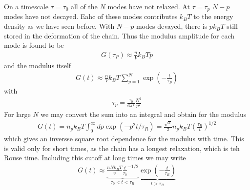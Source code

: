 \documentclass[letterpaper,10pt,english]{sphinxmanual}
\begin{document}
\sphinxAtStartPar
On a timescale \(\tau=\tau_0\) all of the \(N\) modes have not relaxed. At \(\tau=\tau_p\) \(N-p\) modes have not decayed. Eahc of these modes contributes \(k_B T\) to the energy density as we have seen before. With \(N-p\) modes devayed, there is \(pk_B T\) still stored in the deformation of the chain. Thus the modulus amplitude for each mode is found to be
\begin{equation*}
\begin{split}G(\tau_P)\approx \frac{n}{V}k_B T p\end{split}
\end{equation*}
\sphinxAtStartPar
and the modulus itself
\begin{equation*}
\begin{split}G(t)\approx \frac{n}{V}k_B T \sum_{p=1}^{N}\exp\left (-\frac{t}{\tau_P}\right )\end{split}
\end{equation*}
\sphinxAtStartPar
with
\begin{equation*}
\begin{split}\tau_p=\frac{\tau_0}{6\pi^2}\frac{N^2}{p^2}\end{split}
\end{equation*}
\sphinxAtStartPar
For large \(N\) we may convert the sum into an integral and obtain for the modulus
\begin{equation*}
\begin{split}G(t)=n_{p} k_{B} T \int_{0}^{\infty} d p \exp \left(-p^{2} t / \tau_{R}\right)=\frac{\sqrt{\pi}}{2} n_{p} k_{B} T\left(\frac{\tau_{R}}{t}\right)^{1 / 2}\end{split}
\end{equation*}
\sphinxAtStartPar
which gives an inversse square root dependence for the modulus with time. This is valid only for short times, as the chain has a longest relaxation, which is teh Rouse time. Including this cut\sphinxhyphen{}off at long times we may write
\begin{equation*}
\begin{split}G(t)\approx \underbrace{\frac{nNk_B T}{v}\frac{t}{\tau_0}^{-1/2}}_{\tau_0<t<\tau_R}\underbrace{\exp\left ( -\frac{t}{\tau_R}\right )}_{t>\tau_R}\end{split}
\end{equation*}
\noindent{}
\end{document}
